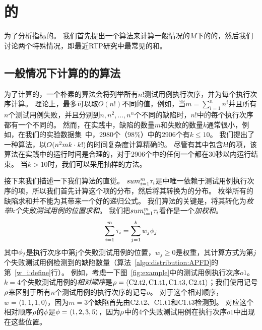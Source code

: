 \chapter{\APFD{}的\Distribution}

为了分析指标\APFD{}的\distribution{}。
我们首先提出一个算法来计算一般情况的$M$下的\APFD{}的\distribution{}，然后我们讨论两个特殊情况，即最近RTP研究中最常见的\mappingAllToOne{}\mappingMatrices{}和\mappingOneToOne{}\mappingMatrices{}。

\section{一般情况下计算\APFD{}的\Distribution{}的算法}\label{sec:dpalgorithm}

为了计算\APFD{}的\distribution{}，一个朴素的算法会将列举所有$n!$测试用例执行次序，并为每个执行次序计算\APFD{}。
理论上，\APFD{}最多可以取$O(n!)$不同的值，例如，当$m=\sum_{i=1}^nn^i$并且所有$n$个测试用例失败，并且分别\detect 到$n,n^2,\ldots,n^n$个不同的缺陷时，$n!$中的每个执行次序都有一个不同的\APFD{}。
然而，在实践中，缺陷的数量$m$和失败的数量$k$通常很小，例如，在我们的实验数据集~\cite{Peng2020IRTCP}中，2980个（98\%）\job{}中的2906个有$k\le 10$。
我们提出了一种算法，以$O(n^2mk\cdot k!)$的时间复杂度计算精确的\distribution{}。
尽管有其中包含$k!$的项，该算法在实践中的运行时间是合理的，对于2906个\job{}中的任何一个都在30秒以内运行结束。
当$k>10$时，我们可以采用抽样的方法。

接下来我们描述一下我们算法的直觉。
$sum_{i=1}^m\tau_i$是\APFD{}中唯一依赖于测试用例执行次序的项，所以我们首先计算这个项的分布，然后将其转换为\APFD{}的分布。
枚举所有的缺陷求和并不能为其带来一个好的递归公式。
我们算法的关键是，将其转化为\emph{枚举$k$个失败测试用例的位置求和}。
我们把$sum_{i=1}^m\tau_i$看作是一个\emph{加权和}。
\begin{equation}\label{TF:weighted:sum}
\sum_{i=1}^m\tau_i=\sum_{j=1}^kw_j\phi_j
\end{equation}
其中$\phi_j$是执行次序中第j个失败测试用例的位置，$w_j\ge 0$是权重，其计算方式为第$j$个失败测试用例检测到的缺陷数量（算法~\ref{algo:distribution:APFD}的第~\ref{w_i:define}行）。
例如，考虑一下图~\ref{fig:example}中的测试用例执行次序$o1$。
$k=4$个失败测试用例的\emph{相对顺序}是$\rho=\langle\mathrm{C2.t2,C1.t1,C1.t3,C2.t1}\rangle$；我们使用记号$\rho$来区别于所有$n$个测试用例的执行次序的记号$o$。
对于这个相对顺序，$w=\langle 1,1,1,0\rangle$，因为$m=3$个缺陷首先由$\mathrm{C2.t2}$、$\mathrm{C1.t1}$和$\mathrm{C1.t3}$检测到。
对应这个相对顺序$\rho$的$\phi$是$\phi=\langle 1,2,3,5\rangle$，因为$\rho$中的$4$个失败测试用例在执行次序$o1$中出现在这些位置。

